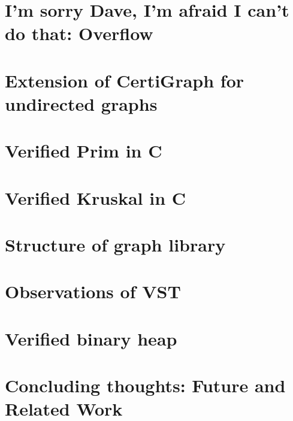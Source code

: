 \documentclass[runningheads]{llncs}
\newcommand\hide[1]{}
\begin{document}
	\section{I'm sorry Dave, I'm afraid I can't do that: Overflow}
	\label{sec:overflow}
	
	
	\section{Extension of CertiGraph for undirected graphs}
	\label{sec:undirected}
	
	
	\section{Verified Prim in C}
	\label{sec:prim}
	
	
	\section{Verified Kruskal in C}
	\label{sec:kruskal}
	

	\section{Structure of graph library}
	\label{sec:structure}
	

	\section{Observations of VST}
	\label{sec:vst}
	

    \section{Verified binary heap}
    \label{sec:binheap}
    
	
	
	\section{Concluding thoughts: Future and Related Work}
	\label{sec:conclusion}
	
	
	
	\appendix
	\label{sec:apx}
	
	
\end{document}
